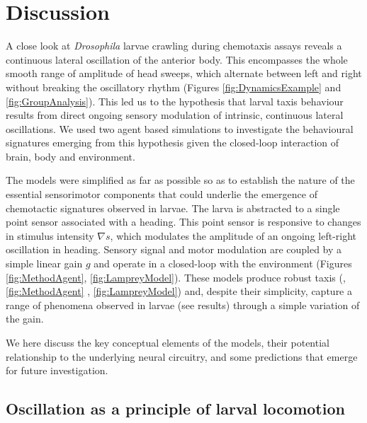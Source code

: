 \documentclass[11pt,a4paper]{article}
\newcommand{\Dros }{\emph{Drosophila }}
\newcommand{\todoBW}[1]{\todo[author=BW,color=orange, size=\tiny,inline]{#1}}
\begin{document}
\section{Discussion}
A close look at \Dros larvae crawling during chemotaxis assays reveals a continuous lateral oscillation of the anterior body. This encompasses the whole smooth range of amplitude of head sweeps, which alternate between left and right without breaking the oscillatory rhythm (Figures \ref{fig:DynamicsExample} and \ref{fig:GroupAnalysis}). 
This led us to the hypothesis that larval taxis behaviour results from direct ongoing sensory modulation of intrinsic, continuous lateral oscillations. We used two agent based simulations to investigate the behavioural signatures emerging from this hypothesis given the closed-loop interaction of brain, body and environment.
 
The models were simplified as far as possible so as to establish the nature of the essential sensorimotor components that could underlie the emergence of chemotactic signatures observed in larvae.
The larva is abstracted to a single point sensor associated with a heading. This point sensor is responsive to changes in stimulus intensity $\nabla s$, which modulates the amplitude of an ongoing left-right oscillation in heading.
 Sensory signal and motor modulation are coupled by a simple linear gain $g$ and operate in a closed-loop with the environment (Figures \ref{fig:MethodAgent}, \ref{fig:LampreyModel}). 
These models produce robust taxis (, \ref{fig:MethodAgent} , \ref{fig:LampreyModel}) and, despite their simplicity, capture a range of phenomena observed in larvae (see results) through a simple variation of the gain.

 We here discuss the key conceptual elements of the models, their potential relationship to the underlying neural circuitry, and some predictions that emerge for future investigation.


\subsection{Oscillation as a principle of larval locomotion}
\end{document}
